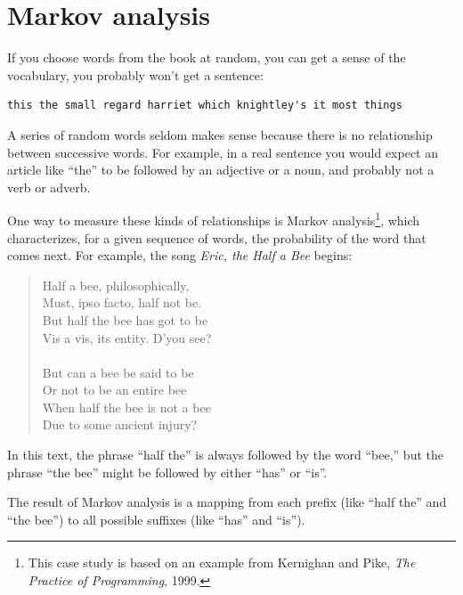\documentclass[10pt]{book}
\begin{document}
\section{Markov analysis}


If you choose words from the book at random, you can get a
sense of the vocabulary, you probably won't get a sentence:

\beforeverb
\begin{verbatim}
this the small regard harriet which knightley's it most things
\end{verbatim}
\afterverb
%
A series of random words seldom makes sense because there
is no relationship between successive words.  For example, in
a real sentence you would expect an article like ``the'' to
be followed by an adjective or a noun, and probably not a verb
or adverb.

One way to measure these kinds of relationships is Markov
analysis\footnote{This case study is based on an example from
  Kernighan and Pike, {\em The Practice of Programming}, 1999.}, which
characterizes, for a given sequence of words, the probability of the
word that comes next.  For example, the song {\em Eric, the Half a
  Bee} begins:

\begin{quote}
Half a bee, philosophically, \\
Must, ipso facto, half not be. \\
But half the bee has got to be \\
Vis a vis, its entity. D'you see? \\
\\
But can a bee be said to be \\
Or not to be an entire bee \\
When half the bee is not a bee \\
Due to some ancient injury? \\
\end{quote}
%
In this text,
the phrase ``half the'' is always followed by the word ``bee,''
but the phrase ``the bee'' might be followed by either
``has'' or ``is''.


The result of Markov analysis is a mapping from each prefix
(like ``half the'' and ``the bee'') to all possible suffixes
(like ``has'' and ``is'').

\end{document}
